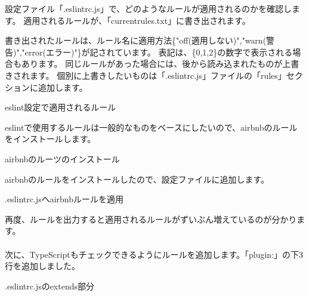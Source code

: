 設定ファイル「.eslintrc.js」で、どのようなルールが適用されるのかを確認します。
適用されるルールが、「current\textunderscore{}rules.txt」に書き出されます。

\vspace*{\baselineskip}

書き出されたルールは、ルール名に適用方法\{"off(適用しない)","warn(警告)","error(エラー)"\}が記されています。
表記は、\{0,1,2\}の数字で表示される場合もあります。
同じルールがあった場合には、後から読み込まれたものが上書きされます。
個別に上書きしたいものは「.eslintrc.js」ファイルの「rules」セクションに追加します。

\def\startercodeblockfontsize{}
\begin{starterterminal}[]{eslint設定で適用されるルール}\end{starterterminal}

eslintで使用するルールは一般的なものをベースにしたいので、airbnbのルールをインストールします。

\def\startercodeblockfontsize{}
\begin{starterterminal}[]{airbnbのルーツのインストール}\end{starterterminal}

airbnbのルールをインストールしたので、設定ファイルに追加します。

\def\startercodeblockfontsize{}
\begin{starterprogram}[]{.eslintrc.jsへairbnbルールを適用}\end{starterprogram}

再度、ルールを出力すると適用されるルールがずいぶん増えているのが分かります。
\\[0pt]
\\[0pt]
次に、TypeScriptもチェックできるようにルールを追加します。「plugin:」の下3行を追加しました。

\def\startercodeblockfontsize{}
\begin{starterprogram}[]{.eslintrc.jsのextends部分}\end{starterprogram}

